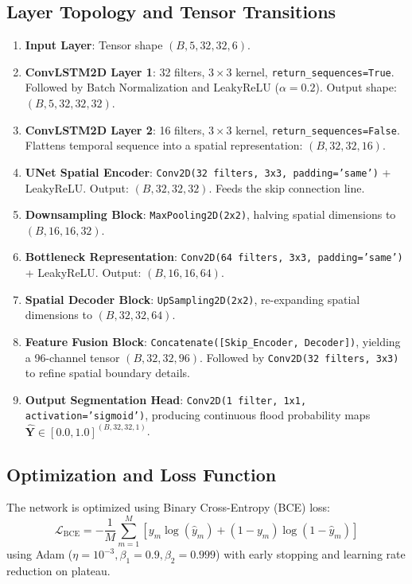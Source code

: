 \documentclass[12pt,a4paper,oneside]{report}
\begin{document}
\subsection{Layer Topology and Tensor Transitions}
\begin{enumerate}
    \item \textbf{Input Layer}: Tensor shape $(B, 5, 32, 32, 6)$.
    \item \textbf{ConvLSTM2D Layer 1}: 32 filters, $3 \times 3$ kernel, \texttt{return\_sequences=True}. Followed by Batch Normalization and LeakyReLU ($\alpha = 0.2$). Output shape: $(B, 5, 32, 32, 32)$.
    \item \textbf{ConvLSTM2D Layer 2}: 16 filters, $3 \times 3$ kernel, \texttt{return\_sequences=False}. Flattens temporal sequence into a spatial representation: $(B, 32, 32, 16)$.
    \item \textbf{UNet Spatial Encoder}: \texttt{Conv2D(32 filters, 3x3, padding='same')} + LeakyReLU. Output: $(B, 32, 32, 32)$. Feeds the skip connection line.
    \item \textbf{Downsampling Block}: \texttt{MaxPooling2D(2x2)}, halving spatial dimensions to $(B, 16, 16, 32)$.
    \item \textbf{Bottleneck Representation}: \texttt{Conv2D(64 filters, 3x3, padding='same')} + LeakyReLU. Output: $(B, 16, 16, 64)$.
    \item \textbf{Spatial Decoder Block}: \texttt{UpSampling2D(2x2)}, re-expanding spatial dimensions to $(B, 32, 32, 64)$.
    \item \textbf{Feature Fusion Block}: \texttt{Concatenate([Skip\_Encoder, Decoder])}, yielding a 96-channel tensor $(B, 32, 32, 96)$. Followed by \texttt{Conv2D(32 filters, 3x3)} to refine spatial boundary details.
    \item \textbf{Output Segmentation Head}: \texttt{Conv2D(1 filter, 1x1, activation='sigmoid')}, producing continuous flood probability maps $\hat{\mathbf{Y}} \in [0.0, 1.0]^{(B, 32, 32, 1)}$.
\end{enumerate}

\subsection{Optimization and Loss Function}
The network is optimized using Binary Cross-Entropy (BCE) loss:
\begin{equation}
\mathcal{L}_{\text{BCE}} = -\frac{1}{M}\sum_{m=1}^{M} \left[ y_m \log(\hat{y}_m) + (1 - y_m)\log(1 - \hat{y}_m) \right]
\end{equation}
using Adam ($\eta = 10^{-3}, \beta_1 = 0.9, \beta_2 = 0.999$) with early stopping and learning rate reduction on plateau.
\end{document}
